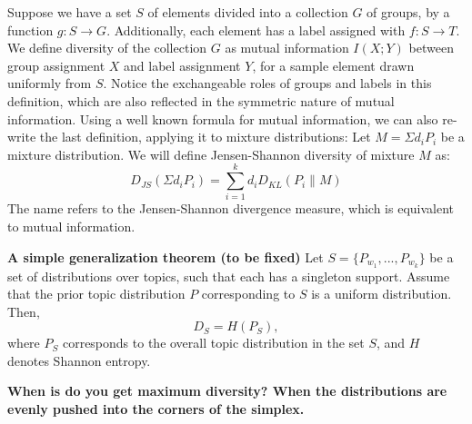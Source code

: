 \bed\label{mutual}
Suppose we have a set $S$ of elements divided into a collection $G$ of
groups, by a function $g:S\rightarrow G$. Additionally, each element
has a label assigned with $f:S\rightarrow T$. We define diversity
of the collection $G$ as
mutual information $I(X;Y)$ between group assignment $X$ and label
assignment $Y$, for 
a sample element drawn uniformly from $S$.
\eed
Notice the exchangeable roles of groups and labels in this
definition, which are also reflected in the symmetric nature of mutual
information. Using a well known formula for mutual information, we 
can also re-write the last definition, applying it to mixture
distributions:
\bed\label{mixture}
Let $M=\Sigma d_i P_i$ be a mixture distribution. We will define
Jensen-Shannon diversity of mixture $M$ as:
\[D_{JS}(\Sigma d_iP_i) = \sum_{i=1}^k d_i D_{KL}(P_i\|M)\]
\eed
The name refers to the Jensen-Shannon divergence measure, which
is equivalent to mutual information.

{\bf A simple generalization theorem (to be fixed)}
\bep\label{entropy}
Let $S=\{P_{w_1},...,P_{w_k}\}$ be a set of distributions over topics,
such that each has a singleton support. Assume that the prior
topic distribution $P$ corresponding to $S$ is a uniform
distribution. Then, 
\[D_S=H(P_S),\]
where $P_S$ corresponds to the overall topic distribution in the set
$S$, and $H$ denotes Shannon entropy.
\eep

{\bf When is do you get maximum diversity? When the distributions are
  evenly pushed into the corners of the simplex.}


